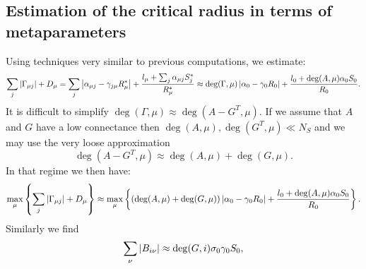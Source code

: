 \documentclass[12pt, titlepage, twoside, openright]{report}
\begin{document}
\subsection{Estimation of the critical radius in terms of metaparameters}\label{sec : estimate critical radius parameters}
Using techniques very similar to previous computations, we estimate:
\begin{equation}
\sum_j \left|{\Gamma_{\mu j}}\right|+D_\mu = \sum_j \left|{\alpha_{\mu j}-\gamma_{j\mu}R^*_\mu}\right|+\frac{l_\mu+\sum_j\alpha_{\mu j} S^*_j}{R^*_\mu} \approx \deg(\Gamma, \mu)\left|{\alpha_0 - \gamma_0 R_0}\right|+\frac{l_0+\deg(A,\mu)\alpha_0 S_0}{R_0}.
\end{equation}
It is difficult to simplify $\deg(\Gamma, \mu) \approx \deg(A-G^T, \mu)$. If we assume that $A$ and $G$ have a low connectance then $\deg(A, \mu), \deg(G^T, \mu) \ll N_S$ and we may use the very loose approximation
\begin{equation}
\deg(A-G^T, \mu) \approx \deg(A, \mu)+\deg(G, \mu).
\end{equation}
In that regime we then have:
\begin{equation}
\max_\mu\left\{\sum_j \left|{\Gamma_{\mu j}}\right|+D_\mu\right\} \approx \max_\mu\left\{\left(\deg(A, \mu)+\deg(G, \mu)\right)\left|{\alpha_0-\gamma_0 R_0}\right|+\frac{l_0+\deg(A,\mu)\alpha_0 S_0}{R_0}\right\}.
\end{equation}
Similarly we find
\begin{equation}
\sum_\nu \left|{B_{i\nu}}\right| \approx \deg(G, i) \sigma_0 \gamma_0 S_0,
\end{equation}
\end{document}

